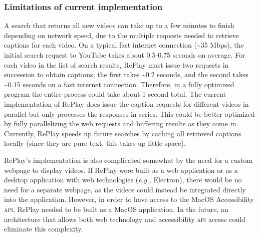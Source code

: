 \subsubsection{Limitations of current implementation}
A search that returns all new videos can take up to a few minutes to finish depending on network speed, due to the multiple requests needed to retrieve captions for each video. On a typical fast internet connection (\textasciitilde35 Mbps), the initial search request to YouTube takes about 0.5-0.75 seconds on average. For each video in the list of search results, RePlay must issue two requests in succession to obtain captions; the first takes \textasciitilde0.2 seconds, and the second takes \textasciitilde0.15 seconds on a fast internet connection. Therefore, in a fully optimized program the entire process could take about 1 second total. 
The current implementation of RePlay does issue the caption requests for different videos in parallel but only processes the responses in series. This could be better optimized by fully parallelizing the web requests and buffering results as they come in. Currently, RePlay speeds up future searches by caching all retrieved captions locally (since they are pure text, this takes up little space).

RePlay's implementation is also complicated somewhat by the need for a custom webpage to display videos. If RePlay were built as a web application or as a desktop application with web technologies (\textit{e.g.,} Electron), there would be no need for a separate webpage, as the videos could instead be integrated directly into the application. However, in order to have access to the MacOS Accessibility \textsc{api}, RePlay needed to be built as a MacOS application. In the future, an architecture that allows both web technology and accessibility \textsc{api} access could eliminate this complexity.